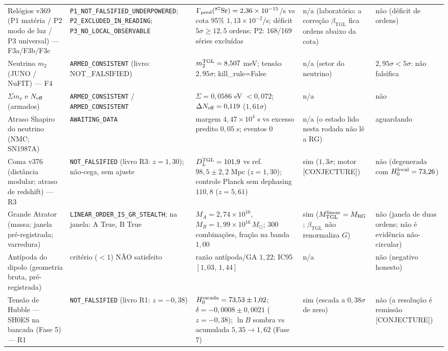 \documentclass[11pt]{article}
\newcommand{\bTGL}{\beta_{\mathrm{TGL}}}\newcommand{\Msun}{M_{\odot}}\newcommand{\TGL}{\mathrm{TGL}}
\theoremstyle{definition}\newtheorem{deriv}{Derivação}
\begin{document}
\begin{footnotesize}
\begin{longtable}{@{}p{}p{}p{}p{}p{}@{}}
Relógios v369 (P1 matéria / P2 modo de luz / P3 universal) --- F3a/F3b/F3c & \texttt{P1\_\allowbreak{}NOT\_\allowbreak{}FALSIFIED\_\allowbreak{}UNDERPOWERED}; \texttt{P2\_\allowbreak{}EXCLUDED\_\allowbreak{}IN\_\allowbreak{}READING}; \texttt{P3\_\allowbreak{}NO\_\allowbreak{}LOCAL\_\allowbreak{}OBSERVABLE} & $\Gamma_{\rm pred}(^{87}\mathrm{Sr})=2{,}36\times10^{-15}$/s vs cota 95\% $1{,}13\times10^{-2}$/s; déficit $5\sigma\geq12{,}5$ ordens; P2: 168/169 séries excluídas & n/a (laboratório: a correção $\bTGL$ fica ordens abaixo da cota) & não (déficit de ordens) \\
Neutrino $m_2$ (JUNO / NuFIT) --- F4 & \texttt{ARMED\_\allowbreak{}CONSISTENT} (livro: NOT\_FALSIFIED) & $m_2^{\rm TGL}=8{,}507$ meV; tensão $2{,}95\sigma$; kill\_rule=False & n/a (setor do neutrino) & $2{,}95\sigma<5\sigma$: não falsifica \\
$\Sigma m_\nu$ e $N_{\rm eff}$ (armados) & \texttt{ARMED\_\allowbreak{}CONSISTENT} / \texttt{ARMED\_\allowbreak{}CONSISTENT} & $\Sigma=0{,}0586$ eV $<0{,}072$; $\Delta N_{\rm eff}=0{,}119$ ($1{,}61\sigma$) & n/a & não \\
Atraso Shapiro do neutrino (NMC; SN1987A) & \texttt{AWAITING\_\allowbreak{}DATA} & margem $4{,}47\times10^{4}$ s vs excesso predito $0{,}05$ s; eventos 0 & n/a (o estado lido nesta rodada não lê a RG) & aguardando \\
Coma v376 (distância modular; atraso de redshift) --- R3 & \texttt{NOT\_\allowbreak{}FALSIFIED} (livro R3: $z=1{,}30$); não-cega, sem ajuste & $D_L^{\rm TGL}=101{,}9$ vs ref.\ $98{,}5\pm2{,}2$ Mpc ($z=1{,}30$); controle Planck sem dephasing $110{,}8$ ($z=5{,}61$) & sim ($1{,}3\sigma$; motor \textsf{[CONJECTURE]}) & não (degenerada com $H_0^{\rm local}=73{,}26$) \\
Grande Atrator (massa; janela pré-registrada; varredura) & \texttt{LINEAR\_\allowbreak{}ORDER\_\allowbreak{}IS\_\allowbreak{}GR\_\allowbreak{}STEALTH}; na janela: A True, B True & $M_A=2{,}74\times10^{16}$, $M_B=1{,}99\times10^{16}\,M_\odot$; 300 combinações, fração na banda $1{,}00$ & sim ($M^{\rm linear}_{\rm TGL}=M_{\rm RG}$; $\bTGL$ não renormaliza $G$) & não (janela de duas ordens; não é evidência não-circular) \\
Antípoda do dipolo (geometria bruta, pré-registrada) & critério ($<1$) NÃO satisfeito & razão antípoda/GA $1{,}22$; IC95 $[1{,}03,\,1{,}44]$ & n/a & não (negativo honesto) \\
Tensão de Hubble --- SH0ES na bancada (Fase 5) --- R1 & \texttt{NOT\_\allowbreak{}FALSIFIED} (livro R1: $z=-0{,}38$) & $H_0^{\rm escada}=73{,}53\pm1{,}02$; $\delta=-0{,}0008\pm0{,}0021$ ($z=-0{,}38$); $\ln B$ sombra vs acumulada $5{,}35\to1{,}62$ (Fase 7) & sim (escada a $0{,}38\sigma$ de zero) & não (a resolução é remissão \textsf{[CONJECTURE]}) \\

\end{longtable}
\end{footnotesize}
\end{document}
